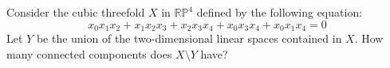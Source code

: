 Consider the cubic threefold $X$ in $\mathbb{RP}^4$ defined by the following equation:
\[
x_0x_1x_2 + x_1x_2x_3 + x_2x_3x_4 + x_0x_3x_4 + x_0x_1x_4 = 0
\]
Let $Y$ be the union of the two-dimensional linear spaces contained in $X$. How many connected components does $X \setminus Y$ have?
